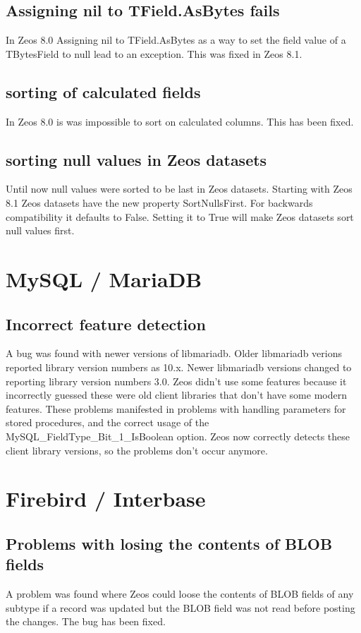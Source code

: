 \documentclass[a4paper,12pt,oneside]{report}
\begin{document}
\subsection{Assigning nil to TField.AsBytes fails}
In Zeos 8.0 Assigning nil to TField.AsBytes as a way to set the field value of a TBytesField to null lead to an exception.
This was fixed in Zeos 8.1.

\subsection{sorting of calculated fields}
In Zeos 8.0 is was impossible to sort on calculated columns.
This has been fixed.

\subsection{sorting null values in Zeos datasets}
Until now null values were sorted to be last in Zeos datasets.
Starting with Zeos 8.1 Zeos datasets have the new property SortNullsFirst.
For backwards compatibility it defaults to False.
Setting it to True will make Zeos datasets sort null values first.

\section{MySQL / MariaDB}
\subsection{Incorrect feature detection}
A bug was found with newer versions of libmariadb.
Older libmariadb verions reported library version numbers as 10.x.
Newer libmariadb versions changed to reporting library version numbers 3.0.
Zeos didn't use some features because it incorrectly guessed these were old client libraries that don't have some modern features.
These problems manifested in problems with handling parameters for stored procedures, and the correct usage of the MySQL\_FieldType\_Bit\_1\_IsBoolean option.
Zeos now correctly detects these client library versions, so the problems don't occur anymore.

\section{Firebird / Interbase}
\subsection{Problems with losing the contents of BLOB fields}
A problem was found where Zeos could loose the contents of BLOB fields of any subtype if a record was updated but the BLOB field was not read before posting the changes.
The bug has been fixed.
\end{document}
